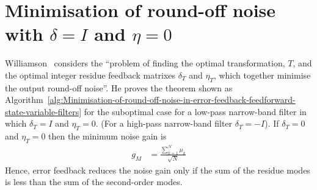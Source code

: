 \documentclass[a4paper,twoside,10pt,english]{report}
\begin{document}
\section{Minimisation of round-off noise with \texorpdfstring{$\delta=I$ and $\eta=0$}{d=I and n=0}}
Williamson~\cite[Section V]
{Williamson_RoundoffNoiseMinimizationUsingResidueFeedback} considers the
``problem of finding the optimal transformation, $T$, and the optimal integer
residue feedback matrixes $\delta_{T}$ and $\eta_{T}$, which together minimise
the output round-off noise''. He proves the theorem shown as 
Algorithm~\ref{alg:Minimisation-of-round-off-noise-in-error-feedback-feedforward-state-variable-filters} 
for the suboptimal case for a low-pass narrow-band filter in which 
$\delta_{T}=I$ and $\eta_{T}=0$. (For a high-pass narrow-band filter 
$\delta_{T}=-I$). If $\delta_{T}=0$ and $\eta_{T}=0$ then the minimum noise
gain is
\begin{align*}
g_{M}&=\frac{\sum_{k=1}^{N}\mu_{k}}{\sqrt{N}}
\end{align*}
Hence, error feedback reduces the noise gain only if the sum of the residue 
modes is less than the sum of the second-order modes.
\end{document}
